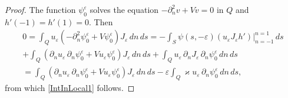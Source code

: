 \documentclass[reqno]{amsart}
\theoremstyle{plain}
\numberwithin{equation}{section}
\renewcommand{\kappa}{\varkappa}
\newcommand{\eps}{\varepsilon}
\begin{document}
\begin{proof}
 The function $\psi_0^\eps$ solves the equation $-\partial_n^2v+Vv=0$ in $Q$ and $h'(-1)=h'(1)=0$. Then
\begin{multline*}
  0=\int_Q u_\eps(-\partial_n^2\psi_0^\eps+V \psi_0^\eps)J_\eps\,dn\,ds
  =-\int_S\psi(s,-\eps) ( u_\eps J_\eps h')\big|_{n=-1}^{n=1}\,ds
  \\+
  \int_Q (\partial_n u_\eps \, \partial_n \psi_0^\eps+Vu_\eps \psi_0^\eps)J_\eps\,dn\,ds+
  \int_Q u_\eps\,\partial_n J_\eps \,\partial_n \psi_0^\eps\,dn\,ds
  \\=\int_Q (\partial_n u_\eps \, \partial_n \psi_0^\eps+Vu_\eps \psi_0^\eps)J_\eps\,dn\,ds-\eps
  \int_Q \kappa u_\eps\,\partial_n \psi_0^\eps\,dn\,ds,
\end{multline*}
from which \eqref{IntInLocal1} follows.






\end{proof}
\end{document}
